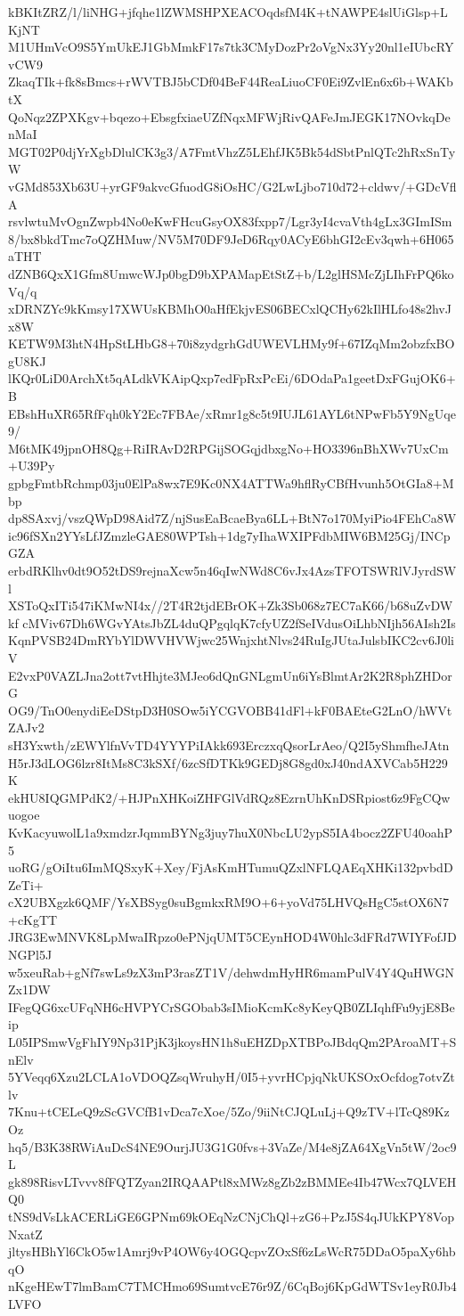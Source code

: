 kBKItZRZ/l/liNHG+jfqhe1lZWMSHPXEACOqdsfM4K+tNAWPE4slUiGlsp+LKjNT
M1UHmVcO9S5YmUkEJ1GbMmkF17s7tk3CMyDozPr2oVgNx3Yy20nl1eIUbcRYvCW9
ZkaqTIk+fk8sBmcs+rWVTBJ5bCDf04BeF44ReaLiuoCF0Ei9ZvlEn6x6b+WAKbtX
QoNqz2ZPXKgv+bqezo+EbsgfxiaeUZfNqxMFWjRivQAFeJmJEGK17NOvkqDenMaI
MGT02P0djYrXgbDlulCK3g3/A7FmtVhzZ5LEhfJK5Bk54dSbtPnlQTc2hRxSnTyW
vGMd853Xb63U+yrGF9akvcGfuodG8iOsHC/G2LwLjbo710d72+cldwv/+GDcVflA
rsvlwtuMvOgnZwpb4No0eKwFHcuGsyOX83fxpp7/Lgr3yI4cvaVth4gLx3GImISm
8/bx8bkdTmc7oQZHMuw/NV5M70DF9JeD6Rqy0ACyE6bhGI2cEv3qwh+6H065aTHT
dZNB6QxX1Gfm8UmwcWJp0bgD9bXPAMapEtStZ+b/L2glHSMcZjLIhFrPQ6koVq/q
xDRNZYc9kKmsy17XWUsKBMhO0aHfEkjvES06BECxlQCHy62kIlHLfo48s2hvJx8W
KETW9M3htN4HpStLHbG8+70i8zydgrhGdUWEVLHMy9f+67IZqMm2obzfxBOgU8KJ
lKQr0LiD0ArchXt5qALdkVKAipQxp7edFpRxPcEi/6DOdaPa1geetDxFGujOK6+B
EBshHuXR65RfFqh0kY2Ec7FBAe/xRmr1g8c5t9IUJL61AYL6tNPwFb5Y9NgUqe9/
M6tMK49jpnOH8Qg+RiIRAvD2RPGijSOGqjdbxgNo+HO3396nBhXWv7UxCm+U39Py
gpbgFmtbRchmp03ju0ElPa8wx7E9Kc0NX4ATTWa9hflRyCBfHvunh5OtGIa8+Mbp
dp8SAxvj/vszQWpD98Aid7Z/njSusEaBcaeBya6LL+BtN7o170MyiPio4FEhCa8W
ic96fSXn2YYsLfJZmzleGAE80WPTsh+1dg7yIhaWXIPFdbMIW6BM25Gj/INCpGZA
erbdRKlhv0dt9O52tDS9rejnaXcw5n46qIwNWd8C6vJx4AzsTFOTSWRlVJyrdSWl
XSToQxITi547iKMwNI4x//2T4R2tjdEBrOK+Zk3Sb068z7EC7aK66/b68uZvDWkf
cMViv67Dh6WGvYAtsJbZL4duQPgqlqK7cfyUZ2fSeIVdusOiLhbNIjh56AIsh2Is
KqnPVSB24DmRYbYlDWVHVWjwc25WnjxhtNlvs24RuIgJUtaJulsbIKC2cv6J0liV
E2vxP0VAZLJna2ott7vtHhjte3MJeo6dQnGNLgmUn6iYsBlmtAr2K2R8phZHDorG
OG9/TnO0enydiEeDStpD3H0SOw5iYCGVOBB41dFl+kF0BAEteG2LnO/hWVtZAJv2
sH3Yxwth/zEWYlfnVvTD4YYYPiIAkk693ErczxqQsorLrAeo/Q2I5yShmfheJAtn
H5rJ3dLOG6lzr8ItMs8C3kSXf/6zcSfDTKk9GEDj8G8gd0xJ40ndAXVCab5H229K
ekHU8IQGMPdK2/+HJPnXHKoiZHFGlVdRQz8EzrnUhKnDSRpiost6z9FgCQwuogoe
KvKacyuwolL1a9xmdzrJqmmBYNg3juy7huX0NbcLU2ypS5IA4bocz2ZFU40oahP5
uoRG/gOiItu6ImMQSxyK+Xey/FjAsKmHTumuQZxlNFLQAEqXHKi132pvbdDZeTi+
cX2UBXgzk6QMF/YsXBSyg0suBgmkxRM9O+6+yoVd75LHVQsHgC5stOX6N7+cKgTT
JRG3EwMNVK8LpMwaIRpzo0ePNjqUMT5CEynHOD4W0hlc3dFRd7WIYFofJDNGPl5J
w5xeuRab+gNf7swLs9zX3mP3rasZT1V/dehwdmHyHR6mamPulV4Y4QuHWGNZx1DW
IFegQG6xcUFqNH6cHVPYCrSGObab3sIMioKcmKc8yKeyQB0ZLIqhfFu9yjE8Beip
L05IPSmwVgFhIY9Np31PjK3jkoysHN1h8uEHZDpXTBPoJBdqQm2PAroaMT+SnElv
5YVeqq6Xzu2LCLA1oVDOQZsqWruhyH/0I5+yvrHCpjqNkUKSOxOcfdog7otvZtlv
7Knu+tCELeQ9zScGVCfB1vDca7cXoe/5Zo/9iiNtCJQLuLj+Q9zTV+lTcQ89KzOz
hq5/B3K38RWiAuDcS4NE9OurjJU3G1G0fvs+3VaZe/M4e8jZA64XgVn5tW/2oc9L
gk898RisvLTvvv8fFQTZyan2IRQAAPtl8xMWz8gZb2zBMMEe4Ib47Wcx7QLVEHQ0
tNS9dVsLkACERLiGE6GPNm69kOEqNzCNjChQl+zG6+PzJ5S4qJUkKPY8VopNxatZ
jltysHBhYl6CkO5w1Amrj9vP4OW6y4OGQcpvZOxSf6zLsWcR75DDaO5paXy6hbqO
nKgeHEwT7lmBamC7TMCHmo69SumtvcE76r9Z/6CqBoj6KpGdWTSv1eyR0Jb4LVFO
